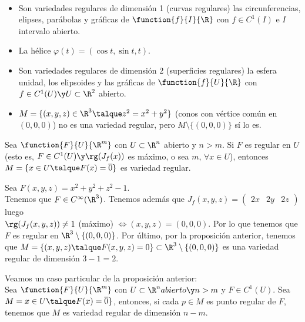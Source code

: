 \begin{ejem} \ 
\begin{itemize}
\item Son variedades regulares de dimensión 1 (curvas regulares) las circunferencias, elipses, parábolas y gráficas de $\function{f}{I}{\R}$ con $f\in C^1(I)$ e $I$ intervalo abierto.
\item La hélice $\varphi(t)=(\cos t,\sin t, t)$.
\item Son variedades regulares de dimensión 2 (superficies regulares) la esfera unidad, los elipsoides y las gráficas de $\function{f}{U}{\R}$ con $f\in C^1(U)\y U\subset\R^2$ abierto.
\item $M=\{(x,y,z)\in\R^3\talque z^2=x^2+y^2\}$ (conos con vértice común en $(0,0,0)$) no es una variedad regular, pero $M\setminus\{(0,0,0)\}$ sí lo es.
\end{itemize}
\end{ejem}

\begin{proposicion} Sea $\function{F}{U}{\R^m}$ con $U\subset\R^n$ abierto y $n>m$. Si $F$ es regular en $U$ (esto es, $F\in C^1(U)\y\rg(J_f(x))$ es máximo, o sea $m$, $\forall x\in U$), entonces $M=\{x\in U\talque F(x)=\overline{0}\}$ es variedad regular.
\end{proposicion}

\begin{ejem} Sea $F(x,y,z)=x^2+y^2+z^2-1$.\\
Tenemos que $F\in C^\infty(\R^3)$. Tenemos además que $J_f(x,y,z)=\begin{pmatrix}2x&2y&2z\end{pmatrix}$ luego\\
$\rg(J_f(x,y,z))\neq 1$ (máximo) $\iff (x,y,z)=(0,0,0)$. Por lo que tenemos que $F$ es regular en $\R^3\setminus\{(0,0,0)\}$. Por último, por la proposición anterior, tenemos que $M=\{(x,y,z)\talque F(x,y,z)=0\}\subset\R^3\setminus\{(0,0,0)\}$ es una variedad regular de dimensión $3-1=2$.
\end{ejem}

\begin{proposicion} Veamos un caso particular de la proposición anterior:\\
Sea $\function{F}{U}{\R^m}$ con $U\subset\R^n abierto\y n>m$ y $F\in C^1(U)$. Sea $M=x\in U\talque F(x)=\overline{0}\}$, entonces, si cada $p\in M$ es punto regular de $F$, tenemos que $M$ es variedad regular de dimensión $n-m$.
\end{proposicion}

